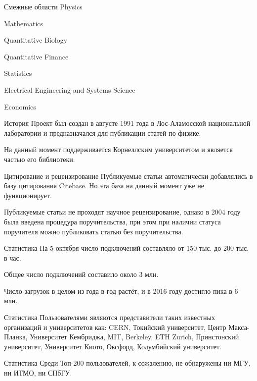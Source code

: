 \documentclass[14pt]{beamer}
\begin{document}
\begin{frame}{Смежные области}
Physics

Mathematics

Quantitative Biology

Quantitative Finance

Statistics

Electrical Engineering and Systems Science

Economics
\end{frame}

\begin{frame}{История}
Проект был создан в августе 1991 года в Лос-Аламосской национальной лаборатории и предназначался для публикации статей по физике.

На данный момент поддерживается Корнеллским университетом и является частью его библиотеки.
\end{frame}

\begin{frame}{Цитирование и рецензирование}
Публикуемые статьи автоматически добавлялись в базу цитирования Citebase. Но эта база на данный момент уже не функционирует.

Публикуемые статьи не проходят научное рецензирование, однако в 2004 году была введена процедура поручительства, при этом при наличии статуса поручителя можно публиковать статью без поручительства.
\end{frame}

\begin{frame}{Статистика}
На 5 октября число подключений составляло от 150 тыс. до 200 тыс. в час.

Общее число подключений составило около 3 млн.

Число загрузок в целом из года в год растёт, и в 2016 году достигло пика в 6 млн.
\end{frame}

\begin{frame}{Статистика}
Пользователями являются представители таких известных организаций и университетов как: CERN, Токийский университет, Центр Макса-Планка, Университет Кембриджа, MIT, Berkeley, ETH Zurich, Принстонский университет, Университет Киото, Оксфорд, Колумбийский университет.
\end{frame}

\begin{frame}{Статистика}
Среди Топ-200 пользователей, к сожалению, не обнаружены ни МГУ, ни ИТМО, ни СПбГУ.
\end{frame}
\end{document}
